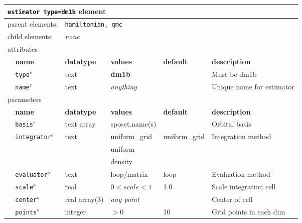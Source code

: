 \FloatBarrier
\begin{table}[h]
\begin{center}
\begin{tabularx}{\textwidth}{l l l l l X }
\hline
\multicolumn{6}{l}{\texttt{estimator type=dm1b} element} \\
\hline
\multicolumn{2}{l}{parent elements:} & \multicolumn{4}{l}{\texttt{hamiltonian, qmc}}\\
\multicolumn{2}{l}{child  elements:} & \multicolumn{4}{l}{\textit{none}}\\
\multicolumn{2}{l}{attributes}  & \multicolumn{4}{l}{}\\
   &   \bfseries name     & \bfseries datatype & \bfseries values & \bfseries default   & \bfseries description \\
   & \texttt{type}$^r$    &  text              & \textbf{dm1b}    &                     & Must be dm1b     \\
   & \texttt{name}$^r$    &  text              & \textit{anything}&                     & Unique name for estimator \\
\multicolumn{2}{l}{parameters}  & \multicolumn{4}{l}{}\\
   &   \bfseries name     & \bfseries datatype & \bfseries values & \bfseries default   & \bfseries description \\
   &\texttt{basis}$^r$         &  text array   & sposet.name(s)   &                     & Orbital basis         \\
   &\texttt{integrator}$^o$    &  text         & uniform\_grid    & uniform\_grid       & Integration method    \\
   &                           &               & uniform          &                     &                       \\
   &                           &               & density          &                     &                       \\
   &\texttt{evaluator}$^o$     &  text         & loop/matrix      & loop                & Evaluation method     \\
   &\texttt{scale}$^o$         &  real         & $0<scale<1$      & 1.0                 & Scale integration cell\\
   &\texttt{center}$^o$        &  real array(3)&\textit{any point}&                     & Center of cell        \\
   &\texttt{points}$^o$        &  integer      & $>0$             & 10                  & Grid points in each dim\\

\end{tabularx}
\end{center}
\end{table}
